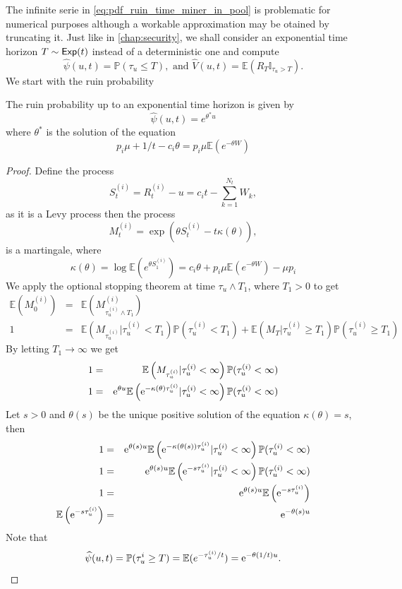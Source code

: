 \noindent The infinite serie in \eqref{eq:pdf_ruin_time_miner_in_pool} is problematic for numerical purposes although a workable approximation may be otained by truncating it. Just like in \cref{chap:security}, we shall consider an exponential time horizon $T\sim\mathsf{Exp}(t)$ instead of a deterministic one and compute
\[
\widehat{\psi}(u,t) = \mathbb{P}(\tau_u \leq T),\text{ and }\widehat{V}(u,t) = \mathbb{E}(R_T\mathbb{I}_{\tau_u > T}).
\]
We start with the ruin probability
\begin{prop}\label{prop:rp_hat_miner_in_pool}
The ruin probability up to an exponential time horizon is given by 
\[
\widehat{\psi}(u,t) = e^{\theta^{\ast} u}
\]
where $\theta^{\ast}$ is the solution of the equation
\[
p_i\mu + 1/t - c_i \theta = p_i\mu\mathbb{E}\left(e^{-\theta W}\right)
\]
\end{prop}
\begin{proof}
Define the process
\[
S_t^{(i)} = R^{(i)}_t-u =c_i t-\sum_{k = 1}^{N_t}W_k,
\]
as it is a Levy process then the process
\[
M_t^{(i)}=\exp\left(\theta S_t^{(i)} - t\kappa(\theta)\right),
\]
is a martingale, where 
\[
\kappa(\theta) =\log \mathbb{E}(e^{\theta S_1^{(i)}}) = c_i\theta + p_i\mu \mathbb{E}\left(e^{-\theta W}\right) -\mu p_i
\]
We apply the optional stopping theorem at time $\tau_u\land T_1$, where $T_1>0$ to get 
\begin{eqnarray*}
\mathbb{E}\left(M_0^{(i)}\right) &=& \mathbb{E}\left(M_{\tau_u^{(i)}\land T_1}^{(i)}\right)\\
1 &=& \mathbb{E}\left(M_{\tau_u^{(i)}}|\tau_u^{(i)} < T_1\right)\mathbb{P}(\tau_u^{(i)} < T_1)+\mathbb{E}\left(M_T|\tau_u^{(i)} \geq T_1\right)\mathbb{P}(\tau_u^{(i)} \geq T_1)
\end{eqnarray*}
By letting $T_1\rightarrow \infty$ we get 
\begin{eqnarray*}
1 &=& \mathbb{E}\left(M_{\tau_u^{(i)}}|\tau_u^{(i)} < \infty\right)\mathbb{P}(\tau_u^{(i)} < \infty)\\
1 &=& \mathrm{e}^{\theta u}\mathbb{E}\left(\mathrm{e}^{-\kappa(\theta) \tau_u^{(i)}}|\tau_u^{(i)} < \infty\right)\mathbb{P}(\tau_u^{(i)} < \infty)
\end{eqnarray*}
Let $s>0$ and $\theta(s)$ be the unique positive solution of the equation $\kappa(\theta) =s$, then 
\begin{eqnarray*}
1 &=& \mathrm{e}^{\theta(s) u}\mathbb{E}\left(\mathrm{e}^{-\kappa(\theta(s)) \tau_u^{(i)}}|\tau_u^{(i)} < \infty\right)\mathbb{P}(\tau_u^{(i)} < \infty)\\
1 &=& \mathrm{e}^{\theta(s) u}\mathbb{E}\left(\mathrm{e}^{-s\tau_u^{(i)}}|\tau_u^{(i)} < \infty\right)\mathbb{P}(\tau_u^{(i)} < \infty)\\
1 &=& \mathrm{e}^{\theta(s) u}\mathbb{E}\left(\mathrm{e}^{-s\tau_u^{(i)}}\right)\\
\mathbb{E}\left(\mathrm{e}^{-s\tau_u^{(i)}}\right) &=& \mathrm{e}^{-\theta(s) u}\\
\end{eqnarray*}
Note that 
\[
\widehat{\psi}(u,t) = \mathbb{P}(\tau_u^{i}\geq T) = \mathbb{E}(e^{-\tau_u^{(i)}/t}) = \mathrm{e}^{-\theta(1/t) u}.
\]
\end{proof}
